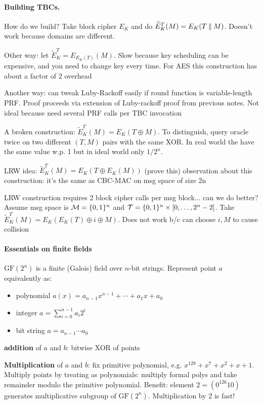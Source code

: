 \documentclass{article}
\newcommand{\tbce}{\widetilde{E}}
\newcommand{\tweakspace}{\calT}
\newcommand{\gf}[1]{\text{GF}(#1)}
\begin{document}
\paragraph{Building TBCs.} How do we build? Take block cipher $E_K$ and do $\tbce^{T}_K(M) = E_K(T\concat M)$. Doesn't work because domains are different.

Other way: let $\tbce^{T}_{K} = E_{E_K(T)}(M)$. Slow because key scheduling can be expensive, and you need to change key every time. For AES this construction has about a factor of 2 overhead

Another way: can tweak Luby-Rackoff easily if round function is variable-length PRF. Proof proceeds via extension of Luby-rackoff proof from previous notes. Not ideal because need several PRF calls per TBC invocation

A broken construction: $\tbce^{T}_K(M) = E_K(T\oplus M)$. To distinguish, query oracle twice on two different $(T, M)$ pairs with the same XOR. In real world the have the same value w.p. 1 but in ideal world only $1/2^n$.

LRW idea: $\tbce^T_K(M) = E_K(T\oplus E_K(M))$ (prove this)
observation about this construction: it's the same as CBC-MAC on msg space of size 2n

LRW construction requires 2 block cipher calls per msg block... can we do better? Assume msg space is $\mathcal{M} = \{0, 1\}^{n}$ and $\tweakspace = \zon{n} \times [0, \ldots, 2^n-2]$. Take $\tbce^T_K(M) = E_K(E_K(T)\oplus i \oplus M)$. Does not work b/c can choose $i,M$ to cause collision

\paragraph{Essentials on finite fields} $\gf{2^n}$ is a finite (Galois) field over $n$-bit strings. Represent point $a$ equivalently as:
\begin{itemize}
    \item polynomial $a(x) = a_{n-1}x^{n-1} + \cdots + a_1 x + a_0$
    \item integer $a = \sum\limits_{i=0}^{n-1} a_i 2^i$
    \item bit string $a= a_{n-1}\cdots a_0$
\end{itemize}

\textbf{addition} of $a$ and $b$: bitwise XOR of points

\textbf{Multiplication} of $a$ and $b$: fix primitive polynomial, e.g. $x^{128} + x^{7} + x^2 + x + 1$. Multiply points by treating as polynomials: multiply formal polys and take remainder modulo the primitive polynomial. Benefit: element $2=(0^{126}10)$ generates multiplicative subgroup of $\gf{2^n}$. Multiplication by 2 is fast!
\end{document}
